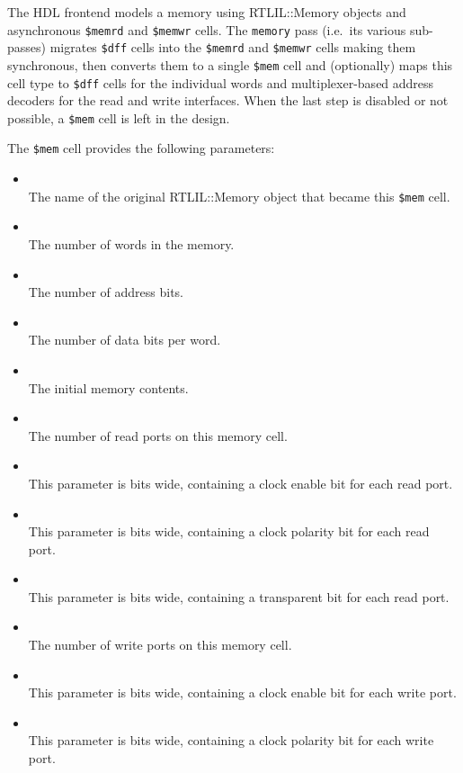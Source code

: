 The HDL frontend models a memory using RTLIL::Memory objects and asynchronous
{\tt \$memrd} and {\tt \$memwr} cells. The {\tt memory} pass (i.e.~its various sub-passes) migrates
{\tt \$dff} cells into the {\tt \$memrd} and {\tt \$memwr} cells making them synchronous, then
converts them to a single {\tt \$mem} cell and (optionally) maps this cell type
to {\tt \$dff} cells for the individual words and multiplexer-based address decoders for the read and
write interfaces. When the last step is disabled or not possible, a {\tt \$mem} cell is left in the design.

The {\tt \$mem} cell provides the following parameters:

\begin{itemize}
\item {} \\
The name of the original RTLIL::Memory object that became this {\tt \$mem} cell.

\item {} \\
The number of words in the memory.

\item {} \\
The number of address bits.

\item {} \\
The number of data bits per word.

\item {} \\
The initial memory contents.

\item {} \\
The number of read ports on this memory cell.

\item {} \\
This parameter is  bits wide, containing a clock enable bit for each read port.

\item {} \\
This parameter is  bits wide, containing a clock polarity bit for each read port.

\item {} \\
This parameter is  bits wide, containing a transparent bit for each read port.

\item {} \\
The number of write ports on this memory cell.

\item {} \\
This parameter is  bits wide, containing a clock enable bit for each write port.

\item {} \\
This parameter is  bits wide, containing a clock polarity bit for each write port.
\end{itemize}

